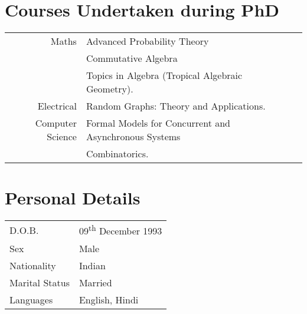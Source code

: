 \documentclass[a4paper,10pt]{article}
\begin{document}
\section{Courses Undertaken during PhD}

\begin{tabular}{rp{11cm}l}
  Maths & Advanced Probability Theory\\ & Commutative Algebra\\ & Topics in Algebra (Tropical Algebraic Geometry). \\
  Electrical & Random Graphs: Theory and Applications. \\
  Computer Science & Formal Models for Concurrent and Asynchronous Systems\\ & Combinatorics.
\end{tabular}

\section{Personal Details}

\begin{tabular}{ll}
  D.O.B. & 09\textsuperscript{th} December 1993 \\
  Sex & Male \\
  Nationality & Indian \\
  Marital Status & Married \\
  Languages & English, Hindi
\end{tabular}
\end{document}
